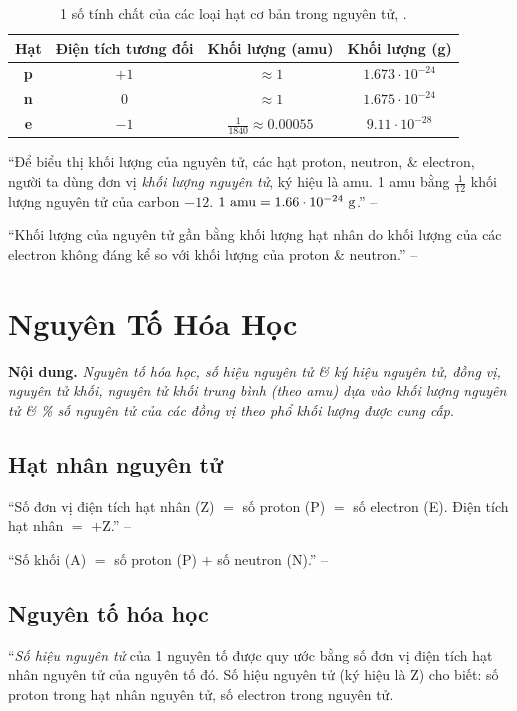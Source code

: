 \documentclass[oneside]{book}
\numberwithin{equation}{section}
\begin{document}
\begin{table}[H]
	\centering
	\begin{tabular}{|c|c|c|c|}
		\hline
		\textbf{Hạt} & \textbf{Điện tích tương đối} & \textbf{Khối lượng (amu)} & \textbf{Khối lượng (g)} \\
		\hline
		\textbf{p} & $+1$ & $\approx 1$ & $1.673\cdot 10^{-24}$ \\
		\hline
		\textbf{n} & $0$ & $\approx 1$ & $1.675\cdot 10^{-24}$ \\
		\hline 
		\textbf{e} & $-1$ & $\frac{1}{1840}\approx 0.00055$ & $9.11\cdot 10^{-28}$ \\
		\hline
	\end{tabular}
	\caption{1 số tính chất của các loại hạt cơ bản trong nguyên tử, \cite[Bảng 2.1, p. 18]{SGK_Hoa_Hoc_10_Chan_Troi_Sang_Tao}.}
\end{table}
``Để biểu thị khối lượng của nguyên tử, các hạt proton, neutron, \& electron, người ta dùng đơn vị \textit{khối lượng nguyên tử}, ký hiệu là amu. 1 amu bằng $\frac{1}{12}$ khối lượng nguyên tử của carbon $-12$. $\rm 1\ amu = 1.66\cdot 10^{-24}\ g$.'' -- \cite[p. 18]{SGK_Hoa_Hoc_10_Chan_Troi_Sang_Tao}

``Khối lượng của nguyên tử gần bằng khối lượng hạt nhân do khối lượng của các electron không đáng kể so với khối lượng của proton \& neutron.'' -- \cite[p. 19]{SGK_Hoa_Hoc_10_Chan_Troi_Sang_Tao}


\section{Nguyên Tố Hóa Học}
\textbf{Nội dung.} \textit{Nguyên tố hóa học, số hiệu nguyên tử \& ký hiệu nguyên tử, đồng vị, nguyên tử khối, nguyên tử khối trung bình (theo amu) dựa vào khối lượng nguyên tử \& \% số nguyên tử của các đồng vị theo phổ khối lượng được cung cấp}.

\subsection{Hạt nhân nguyên tử}
``Số đơn vị điện tích hạt nhân (Z) $=$ số proton (P) $=$ số electron (E). Điện tích hạt nhân $=$ $+$Z.'' -- \cite[p. 20]{SGK_Hoa_Hoc_10_Chan_Troi_Sang_Tao}

``Số khối (A) $=$ số proton (P) + số neutron (N).'' -- \cite[p. 21]{SGK_Hoa_Hoc_10_Chan_Troi_Sang_Tao}

\subsection{Nguyên tố hóa học}
``\textit{Số hiệu nguyên tử} của 1 nguyên tố được quy ước bằng số đơn vị điện tích hạt nhân nguyên tử của nguyên tố đó. Số hiệu nguyên tử (ký hiệu là Z) cho biết: số proton trong hạt nhân nguyên tử, số electron trong nguyên tử.  
\end{document}
